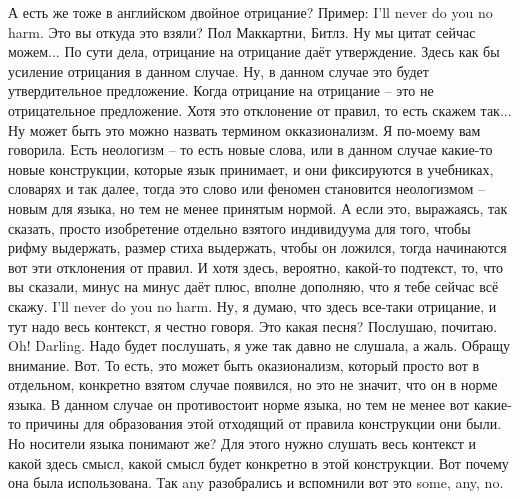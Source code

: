 \documentclass[main.tex]{subfiles}
\begin{document}
А есть же тоже в английском двойное отрицание?
Пример: I'll never do you no harm.
Это вы откуда это взяли?
Пол Маккартни, Битлз.
Ну мы цитат сейчас можем...
По сути дела, отрицание на отрицание даёт утверждение.
Здесь как бы усиление отрицания в данном случае.
Ну, в данном случае это будет утвердительное предложение.
Когда отрицание на отрицание -- это не отрицательное предложение.
Хотя это отклонение от правил, то есть скажем так...
Ну может быть это можно назвать термином окказионализм.
Я по-моему вам говорила.
Есть неологизм -- то есть новые слова, или в данном случае какие-то новые конструкции, которые язык принимает, и они фиксируются в учебниках, словарях и так далее, тогда это слово или феномен становится неологизмом -- новым для языка, но тем не менее принятым нормой.
А если это, выражаясь, так сказать, просто изобретение отдельно взятого индивидуума для того, чтобы рифму выдержать, размер стиха выдержать, чтобы он ложился, тогда начинаются вот эти отклонения от правил.
И хотя здесь, вероятно, какой-то подтекст, то, что вы сказали, минус на минус даёт плюс, вполне дополняю, что я тебе сейчас всё скажу.
I'll never do you no harm.
Ну, я думаю, что здесь все-таки отрицание, и тут надо весь контекст, я честно говоря.
Это какая песня? Послушаю, почитаю.
Oh! Darling.
Надо будет послушать, я уже так давно не слушала, а жаль.
Обращу внимание.
Вот.
То есть, это может быть оказионализм, который просто вот в отдельном, конкретно взятом случае появился, но это не значит, что он в норме языка.
В данном случае он противостоит норме языка, но тем не менее вот какие-то причины для образования этой отходящий от правила конструкции они были.
Но носители языка понимают же?
Для этого нужно слушать весь контекст и какой здесь смысл, какой смысл будет конкретно в этой конструкции.
Вот почему она была использована.
Так any разобрались и вспомнили вот это some, any, no.
\end{document}
